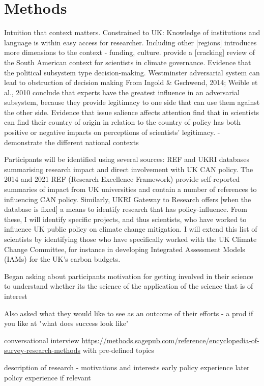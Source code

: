 \chapter{Methods}\label{ch:methods}

Intuition that context matters.
Constrained to UK: Knowledge of institutions and language is within easy access for researcher. Including other [regions] introduces more dimensions to the context - funding, culture. \textcite{IbarraJOBCIMRS2022} provide a [cracking] review of the South American context for scientists in climate governance. Evidence that the political subsystem type decision-making. Westminster adversarial system can lead to obstruction of decision making \cite{PierreP2020} From \textcite{SaxonbergSL2023} Ingold \& Gschwend, 2014; Weible et al., 2010 conclude that experts have the greatest influence in an adversarial subsystem, because they provide legitimacy to one side that can use them against the other side. Evidence that issue salience affects attention \cite{OjanenBKP2021} find that in scientists can find their country of origin in relation to the country of policy has both positive or negative impacts on perceptions of scientists' legitimacy. \cite{StrassheimK2014} - demonstrate the different national contexts

Participants will be identified using several sources: REF and UKRI databases summarising research impact and direct involvement with UK CAN policy. The 2014 and 2021 REF (Research Excellence Framework) provide self-reported summaries of impact from UK universities and contain a number of references to influencing CAN policy. Similarly, UKRI Gateway to Research offers [when the database is fixed] a means to identify research that has policy-influence. From these, I will identify specific projects, and thus scientists, who have worked to influence UK public policy on climate change mitigation. I will extend this list of scientists by identifying those who have specifically worked with the UK Climate Change Committee, for instance in developing Integrated Assessment Models (IAMs) for the UK’s carbon budgets.


Began asking about participants motivation for getting involved in their science to understand whether its the science of the application of the science that is of interest

Also asked what they would like to see as an outcome of their efforts - a prod if you like at "what does success look like"

conversational interview \url{https://methods.sagepub.com/reference/encyclopedia-of-survey-research-methods} with pre-defined topics


description of research
 - motivations and interests
early policy experience
later policy experience if relevant